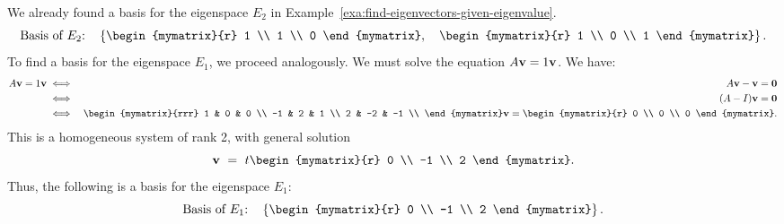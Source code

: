 \begin{solution}
  We already found a basis for the eigenspace $E_2$ in
  Example~\ref{exa:find-eigenvectors-given-eigenvalue}.
  \begin{equation*}
    \mbox{Basis of $E_2$:}\quad\set{
      \begin{mymatrix}{r} 1 \\ 1 \\ 0 \end{mymatrix},\quad
      \begin{mymatrix}{r} 1 \\ 0 \\ 1 \end{mymatrix}
    }.
  \end{equation*}
  To find a basis for the eigenspace $E_1$, we proceed analogously.
  We must solve the equation $A\mbox{\bf v}=1\mbox{\bf v}$. We have:
  \begin{eqnarray*}
    A\vect{v} = 1\vect{v}
    &\iff& A\vect{v} - \vect{v} = \vect{0} \\
    &\iff& (A-I)\vect{v} = \vect{0} \\
    &\iff& \begin{mymatrix}{rrr}
      1  &  0 & 0 \\
      -1 &  2 & 1 \\
      2  & -2 & -1 \\
    \end{mymatrix}\vect{v}
    = \begin{mymatrix}{r} 0 \\ 0 \\ 0 \end{mymatrix}.
  \end{eqnarray*}
  This is a homogeneous system of rank 2, with general solution
  \begin{equation*}
    \vect{v}
    ~=~ t \begin{mymatrix}{r} 0 \\ -1 \\ 2 \end{mymatrix}.
  \end{equation*}
  Thus, the following is a basis for the eigenspace $E_1$:
  \begin{equation*}
    \mbox{Basis of $E_1$:}\quad\set{
      \begin{mymatrix}{r} 0 \\ -1 \\ 2 \end{mymatrix}
    }.
  \end{equation*}
\end{solution}

